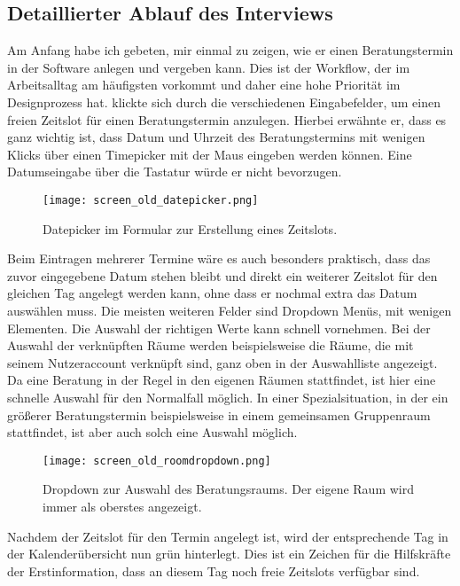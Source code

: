 \subsection*{Detaillierter Ablauf des Interviews}
Am Anfang habe ich \ipName gebeten, mir einmal zu zeigen, wie er einen
Beratungstermin in der Software anlegen und vergeben kann. Dies ist der
Workflow, der im Arbeitsalltag am häufigsten vorkommt und daher eine hohe
Priorität im Designprozess hat. \ipName klickte sich durch die verschiedenen
Eingabefelder, um einen freien Zeitslot für einen Beratungstermin anzulegen.
Hierbei erwähnte er, dass es ganz wichtig ist, dass Datum und Uhrzeit des
Beratungstermins mit wenigen Klicks über einen \gls{Timepicker} mit der Maus
eingeben werden können. Eine Datumseingabe über die Tastatur würde er nicht
bevorzugen.

\begin{figure}[H]
    \caption{Datepicker im Formular zur Erstellung eines Zeitslots.}
    \centering
    \texttt{[image: screen\_old\_datepicker.png]}
\end{figure}

Beim Eintragen mehrerer Termine wäre es auch besonders praktisch, dass das zuvor
eingegebene Datum stehen bleibt und direkt ein weiterer Zeitslot für den
gleichen Tag angelegt werden kann, ohne dass er nochmal extra das Datum
auswählen muss. Die meisten weiteren Felder sind Dropdown Menüs, mit wenigen
Elementen. Die Auswahl der richtigen Werte kann \ipName schnell vornehmen. Bei
der Auswahl der verknüpften Räume werden beispielsweise die Räume, die mit
seinem Nutzeraccount verknüpft sind, ganz oben in der Auswahlliste angezeigt.
Da eine Beratung in der Regel in den eigenen Räumen stattfindet, ist hier eine
schnelle Auswahl für den Normalfall möglich. In einer Spezialsituation, in der
ein größerer Beratungstermin beispielsweise in einem gemeinsamen Gruppenraum
stattfindet, ist aber auch solch eine Auswahl möglich.

\begin{figure}[H]
    \caption{Dropdown zur Auswahl des Beratungsraums. Der eigene Raum wird immer als oberstes angezeigt.}
    \centering
    \texttt{[image: screen\_old\_roomdropdown.png]}
\end{figure}

Nachdem der Zeitslot für den Termin angelegt ist, wird der entsprechende Tag in
der Kalenderübersicht nun grün hinterlegt. Dies ist ein Zeichen für die
Hilfskräfte der Erstinformation, dass an diesem Tag noch freie Zeitslots
verfügbar sind.

